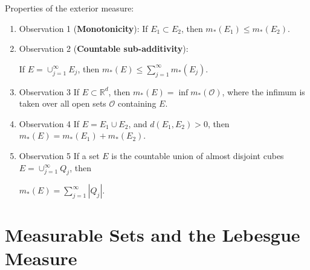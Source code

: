 \documentclass{book}
\newcommand{\RR}{\mathbb R}
\newcommand{\OO}{\mathcal{O}}
\begin{document}
Properties of the exterior measure:
\begin{enumerate}
    \item[]Observation 1 (\textbf{Monotonicity}):
    If $E_1\subset E_2$, then $m_*(E_1)\leq m_*(E_2)$.
    \item[]Observation 2 
    (\textbf{Countable sub-additivity}): 
    
    If $E=\cup_{j=1}^{\infty}E_j$, then $m_*(E)\leq\sum_{j=1}^{\infty}m_*(E_j)$.
    \item[]Observation 3
    If $E\subset\RR^d$, then $m_*(E)=\inf m_*(\OO)$, where the infimum is taken over all open sets $\OO$ containing $E$.
    \item[]Observation 4
    If $E=E_1\cup E_2$, and $d(E_1,E_2)>0$, then $m_*(E)=m_*(E_1)+m_*(E_2)$.
    \item[]Observation 5
    If a set $E$ is the countable union of almost disjoint cubes $E=\cup_{j=1}^\infty Q_j$, then
    \begin{center}
        $m_*(E)=\sum_{j=1}^\infty |Q_j|$.
    \end{center}
\end{enumerate}

\section{Measurable Sets and the Lebesgue Measure}
\end{document}
